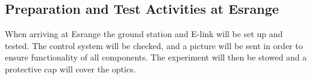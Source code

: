 \subsection{Preparation and Test Activities at Esrange}\label{prep_for_Esrange}
When arriving at Esrange the ground station and E-link will be set up and tested. The control system will be checked, and a picture will be sent in order to ensure functionality of all components. The experiment will then be stowed and a protective cap will cover the optics.
